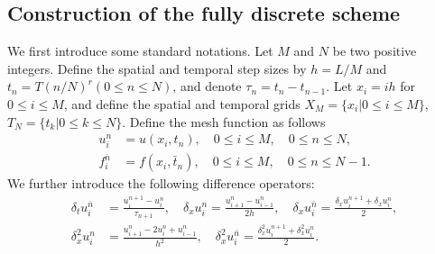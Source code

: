 \documentclass[10pt, reqno]{amsart}
\theoremstyle{remark}
\theoremstyle{definition}
\numberwithin{table}{section}
\begin{document}
\subsection{Construction of the fully discrete scheme }
\label{fullscheme}
We first introduce some standard notations. Let $M$ and $N$ be two positive integers. Define the spatial and temporal step sizes by $h = L/M$ and $ t_n=T(n/{N})^r(0\leq n\leq N)$, and denote $\tau_n = t_n - t_{n-1}$. Let $x_i = ih$ for $0 \le i \le M$, and define the spatial and temporal grids $X_M=\{x_i|0\leq i \leq M\}$, $T_N=\{t_k|0\leq k\leq N\}$.  Define the mesh function as follows
\begin{align*}
u_i^n &= u(x_i, t_n), \quad 0\leq i \leq M, \quad 0\leq n\leq N, \\
f_i^{\bar{n}}&=f(x_i, \bar{t}_n),\quad 0\leq i \leq M,\quad  0\leq n\leq N-1. 
\end{align*}
We further introduce the following difference operators:
\begin{equation}\label{discretization}
\begin{aligned}
{\delta}_t u_i^{\bar{n}}&=\frac{u_i^{n+1}-u_i^n}{\tau_{n+1}}, \quad
{\delta}_x u_i^n=\frac{u_{i+1}^n-u_{i-1}^n}{2 h}, \quad {\delta}_x u_i^{\bar{n}} = \frac{{\delta}_x u_i^{n+1}+{\delta}_x u_i^n}{2} ,\\
\delta_x^2 u_i^n&=\frac{u^n_{i+1}-2u_i^n+u^n_{i-1}}{h^2},\quad \delta_x^2 u_i^{\bar{n}}=\frac{\delta_x^2 u_i^{n+1}+\delta_x^2 u_i^n}{2}. 
\end{aligned}
\end{equation}
\end{document}
